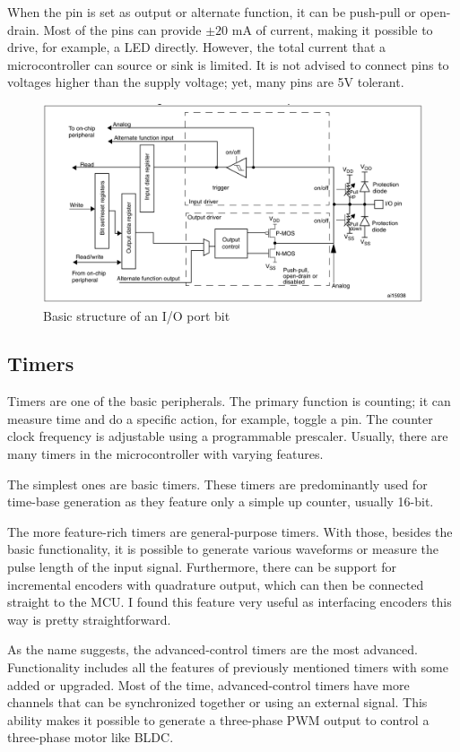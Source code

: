 When the pin is set as output or alternate function, it can be push-pull or open-drain. Most of the pins can provide $\pm20 \text{ mA}$ of current, making it possible to drive, for example, a LED directly. However, the total current that a microcontroller can source or sink is limited. It is not advised to connect pins to voltages higher than the supply voltage; yet, many pins are 5V tolerant.
\begin{figure}
\includegraphics[width=0.9\linewidth]{images/io_port}
\caption{Basic structure of an I/O port bit \cite{f303_ref}} %
\label{fig:gpio}
\end{figure}

	\subsection{Timers}
	\label{sub:timers}
Timers are one of the basic peripherals. The primary function is counting; it can measure time and do a specific action, for example, toggle a pin. The counter clock frequency is adjustable using a programmable prescaler. Usually, there are many timers in the microcontroller with varying features.

The simplest ones are basic timers. These timers are predominantly used for time-base generation as they feature only a simple up counter, usually 16-bit.

The more feature-rich timers are general-purpose timers. With those, besides the basic functionality, it is possible to generate various waveforms or measure the pulse length of the input signal. Furthermore, there can be support for incremental encoders with quadrature output, which can then be connected straight to the MCU. I found this feature very useful as interfacing encoders this way is pretty straightforward.

As the name suggests, the advanced-control timers are the most advanced. Functionality includes all the features of previously mentioned timers with some added or upgraded. Most of the time, advanced-control timers have more channels that can be synchronized together or using an external signal. This ability makes it possible to generate a three-phase PWM output to control a three-phase motor like BLDC.

